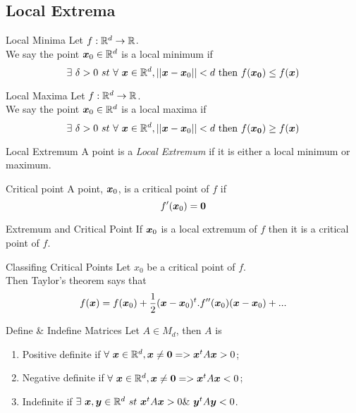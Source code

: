 \documentclass[11pt,a4paper]{article}
\begin{document}
\subsection{Local Extrema}

\subtitle{Definition 15.3 - }{Local Minima}
Let $f : \mathbb{R}^d \to \mathbb{R}$.\\
We say the point $\boldsymbol{x}_0 \in \mathbb{R}^d$ is a local minimum if
$$\exists\ \delta > 0\ st\ \forall\ \boldsymbol{x} \in \mathbb{R}^d, ||\boldsymbol{x} - \boldsymbol{x}_0|| < d \mathrm{\ then\ } f(\boldsymbol{x_0}) \leq f(\boldsymbol{x})$$

\subtitle{Definition 15.4 - }{Local Maxima}
Let $f : \mathbb{R}^d \to \mathbb{R}$.\\
We say the point $\boldsymbol{x}_0 \in \mathbb{R}^d$ is a local maxima if
$$\exists\ \delta > 0\ st\ \forall\ \boldsymbol{x} \in \mathbb{R}^d, ||\boldsymbol{x} - \boldsymbol{x}_0|| < d \mathrm{\ then\ } f(\boldsymbol{x_0}) \geq f(\boldsymbol{x})$$

\subtitle{Definition 15.5 - }{Local Extremum}
A point is a \textit{Local Extremum} if it is either a local minimum or maximum.\\

\subtitle{Definition 15.6 - }{Critical point}
A point, $\boldsymbol{x}_0$, is a critical point of $f$ if $$f'(\boldsymbol{x}_0) = \boldsymbol{0}$$

\subtitle{Proposition 15.7 - }{Extremum and Critical Point}
If $\boldsymbol{x}_0$ is a local extremum of $f$ then it is a critical point of $f$.\\

\subtitle{Remark 15.8 - }{Classifing Critical Points}
Let $x_0$ be a critical point of $f$.\\
Then Taylor's theorem says that
$$f(\boldsymbol{x}) = f(\boldsymbol{x}_0) + \frac{1}{2}(\boldsymbol{x} - \boldsymbol{x}_0)^t.f''(\boldsymbol{x}_0)(\boldsymbol{x} - \boldsymbol{x}_0) + ...$$

\subtitle{Definition 15.9 - }{Define \& Indefine Matrices}
Let $A \in M_d$, then $A$ is
\begin{enumerate}[label=\roman*)]
  \item Positive definite if $\forall\ \boldsymbol{x} \in \mathbb{R}^d, \boldsymbol{x} \not = \boldsymbol{0} => \boldsymbol{x}^tA\boldsymbol{x} > 0$;
  \item Negative definite if $\forall\ \boldsymbol{x} \in \mathbb{R}^d, \boldsymbol{x} \not = \boldsymbol{0} => \boldsymbol{x}^tA\boldsymbol{x} < 0$;
  \item Indefinite if $\exists\ \vect{x}, \vect{y} \in \real^d\ st\ \vect{x}^tA\vect{x} > 0 \&\ \vect{y}^tA\vect{y} < 0$.
\end{enumerate}
\end{document}
